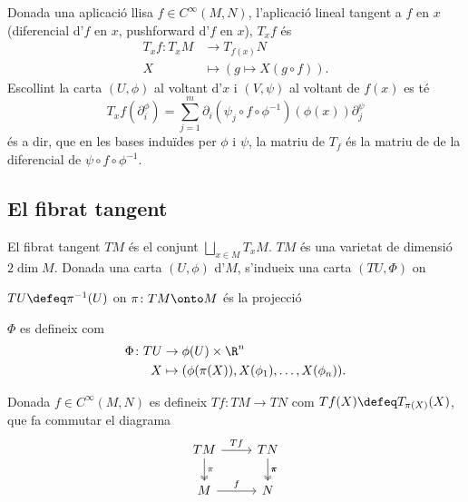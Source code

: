 \documentclass[12pt,twocolumn]{article}
\begin{document}
\begin{definition}
	Donada una aplicació llisa \( f \in C^{\infty}(M,N) \), l'aplicació lineal tangent a \(
	f \) en \( x \) (diferencial d'\( f \) en \( x \), pushforward d'\( f \) en \( x \)), \(
	T_x f \) és
	\begin{align*}
		T_x f \colon T_xM & \to T_{f(x)} N \\
		X & \mapsto (g \mapsto X(g \circ f)).
	\end{align*}
	Escollint la carta \( (U,\phi) \) al voltant d'\( x \) i \( (V,\psi) \) al voltant de \(
	f(x) \) es té
	\begin{equation*}
		T_xf(\partial_i^{\phi}) = \sum_{j = 1}^{m} \partial_i(\psi_j \circ f \circ
		\phi^{-1})(\phi(x)) \partial_j^{\psi} 
	\end{equation*}
	és a dir, que en les bases induïdes per \( \phi \) i \( \psi \), la matriu de \( T_f \)
	és la matriu de de la diferencial de \( \psi \circ f \circ \phi^{-1} \). 
\end{definition}

\subsection{El fibrat tangent}
\begin{definition}
	El fibrat tangent \( TM \) és el conjunt \( \bigsqcup_{x \in M}T_xM \). \( TM \) és una
	varietat de dimensió \( 2 \dim M \). Donada una carta \( (U,\phi) \) d'\( M \),
	s'indueix una carta \( (TU, \Phi) \) on
	\begin{points}
	\item	\( TU \defeq \pi^{-1}(U) \) on \( \pi \colon TM \onto M \) és la projecció
	\item \( \Phi \) es defineix com
		\begin{align*}
			\Phi \colon TU & \to \phi(U) \times \R^n \\
			X & \mapsto (\phi(\pi(X)), X(\phi_1), \dots, X(\phi_n)).
		\end{align*}
	\end{points}
\end{definition}

\begin{definition}
	Donada \( f \in C^{\infty}(M,N) \) es defineix \( Tf \colon TM \to TN \) com \( Tf(X)
	\defeq T_{\pi(X)}(X) \), que fa commutar el diagrama
	\begin{equation*}
		\begin{tikzcd}
			TM \arrow[d, two heads, "\pi"] \arrow[r, "Tf"] & TN \arrow[d, two heads, "\pi", two
			heads, "\pi"] \\
			M \arrow[r, "f"] & N
		\end{tikzcd}
	\end{equation*}
\end{definition}
\end{document}
